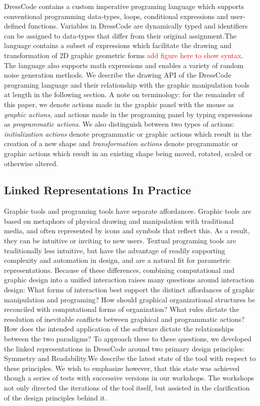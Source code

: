 \documentclass{sigchi}
\begin{document}
 DressCode contains a custom imperative programing language which supports conventional programming data-types, loops, conditional expressions and user-defined functions. Variables in DressCode are dynamically typed and identifiers can be assigned to data-types that differ from their original assignment.The language contains a subset of expressions which facilitate the drawing and transformation of 2D graphic geometric forms \textcolor{red}{add figure here to show syntax}. The language also supports math expressions and enables a variety of random noise generation methods. We describe the drawing API of the DressCode programing language and their relationship with the graphic manipulation tools at length in the following section. A note on terminology: for the remainder of this paper, we denote actions made in the graphic panel with the mouse as \textit{graphic actions}, and actions made in the programing panel by typing expressions as \textit{programmatic actions}. We also distinguish between two types of actions: \textit{initialization actions} denote programmatic or graphic actions which result in the creation of a new shape and \textit{transformation actions} denote programmatic or graphic actions which result in an existing shape being moved, rotated, scaled or otherwise altered.  


\subsection{Linked Representations In Practice}
Graphic tools and programing tools have separate affordances. Graphic tools are based on metaphors of physical drawing and manipulation with traditional media, and often represented by icons and symbols that reflect this. As a result, they can be intuitive or inviting to new users. Textual programing tools are traditionally less intuitive, but have the advantage of readily supporting complexity and automation in design, and are a natural fit for parametric representations. Because of these differences, combining computational and graphic design into a unified interaction raises many questions around interaction design: What forms of interaction best support the distinct affordances of graphic manipulation and programing? How should graphical organizational structures be reconciled with computational forms of organization? What rules dictate the resolution of inevitable conflicts between graphical and programmatic actions? How does the intended application of the software dictate the relationships between the two paradigms? To approach these to these questions, we developed the linked representations in DressCode around two primary design principles: Symmetry and Readability.We describe the latest state of the tool with respect to these principles. We wish to emphasize however, that this state was achieved though a series of tests with successive versions in our workshops. The workshops not only directed the iterations of the tool itself, but assisted in the clarification of the design principles behind it.
\end{document}
